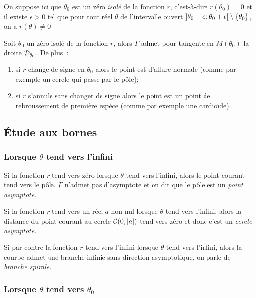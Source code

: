 On suppose ici que \(\theta_0\) est un zéro \emph{isolé} de la fonction \(r\),
c'est-à-dire \(r(\theta_0)=0\) et il existe \(\epsilon >0\) tel que pour tout
réel \(\theta\) de l'intervalle ouvert
\(\left] \theta_0-\epsilon \, ; {} \theta_0 + \epsilon \right[\setminus\{\theta_0\}\),
on a \(r(\theta) \neq 0\)

\begin{prop}[admise]
  Soit \(\theta_0\) un zéro isolé de la fonction \(r\), alors \(\Gamma\) admet
  pour tangente en \(M(\theta_0)\) la droite \(\mathcal{D}_{\theta_0}\). De plus~:
  \begin{enumerate}
    \item si \(r\) change de signe en \(\theta_0\) alors le point est d'allure
      normale (comme par exemple un cercle qui passe par le pôle);
    \item si \(r\) s'annule sans changer de signe alors le point est un point de
      rebroussement de première espèce (comme par exemple une cardioïde).
  \end{enumerate}
\end{prop}

\subsection{Étude aux bornes}

\subsubsection{Lorsque \(\theta\) tend vers l'infini}

Si la fonction \(r\) tend vers zéro lorsque \(\theta\) tend vers l'infini, alors
le point courant tend vers le pôle. \(\Gamma\) n'admet pas d'asymptote et on dit
que le pôle est un \emph{point asymptote}.

Si la fonction \(r\) tend vers un réel \(a\) non nul lorsque \(\theta\) tend
vers l'infini, alors la distance du point courant au cercle
\(\mathcal{C}(0,\left\lvert a\right\rvert)\) tend vers zéro et donc c'est un \emph{cercle asymptote}.

Si par contre la fonction \(r\) tend vers l'infini lorsque \(\theta\) tend vers
l'infini, alors la courbe admet une branche infinie sans direction asymptotique,
on parle de \emph{branche spirale}.

\subsubsection{Lorsque \(\theta\) tend vers \(\theta_0\)}

